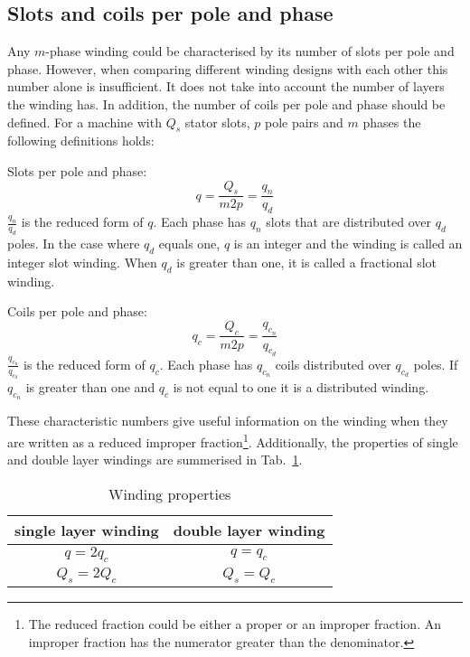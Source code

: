 \subsection{Slots and coils per pole and phase} \label{subsec:slots_coils}
Any $m$-phase winding could be characterised by its number of slots per pole and phase. However, when comparing different winding designs with each other this number alone is insufficient. It does not take into account the number of layers the winding has. In addition, the number of coils per pole and phase should be defined. For a machine with $Q_s$ stator slots, $p$ pole pairs and $m$ phases the following definitions holds:

\begin{defth}
Slots per pole and phase: 
\begin{equation}
  q =\frac{Q_{s}}{m2p}=\frac{q_{n}}{q_{d}}
\end{equation}
$\frac{q_{n}}{q_{d}}$ is the reduced form of $q$. Each phase has $q_n$ slots that are distributed over $q_d$ poles. In the case where $q_d$ equals one, $q$ is an integer and the winding is called an integer slot winding. When $q_d$ is greater than one, it is called a fractional slot winding. 
\end{defth}
\begin{defth}
Coils per pole and phase: 
\begin{equation}
  q_{c}=\frac{Q_{c}}{m2p}=\frac{q_{c_n}}{q_{c_d}}
\end{equation}
$\frac{q_{c_n}}{q_{c_d}}$ is the reduced form of $q_c$. Each phase has $q_{c_n}$ coils distributed over $q_{c_d}$ poles. If $q_{c_n}$ is greater than one and $q_c$ is not equal to one it is a distributed winding. 
\end{defth}
These characteristic numbers give useful information on the winding when they are written as a reduced improper fraction\footnote{The reduced fraction could be either a proper or an improper fraction. An improper fraction has the numerator greater than the denominator.}. Additionally, the properties of single and double layer windings are summerised in Tab.~\ref{tab:properties_single_double}. 

{\renewcommand{\arraystretch}{1.2}
\begin{table}[htbp]
  \caption{Winding properties}
  \label{tab:properties_single_double}
  \centering
  \begin{tabular}{|c|c|}
  \hline
  single layer winding & double layer winding \\
  \hline
  $q = 2q_c$ & $q = q_c$ \\
  $Q_s = 2Q_c$ &  $Q_s = Q_c$ \\
  \hline
  \end{tabular}
\end{table}}

